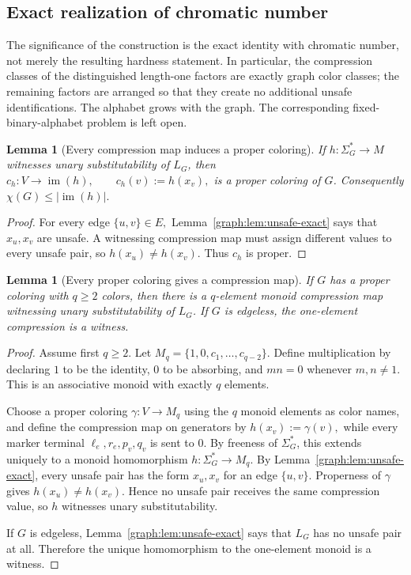 \documentclass[10pt,a4paper]{article}
\newtheorem{lemma}[theorem]{Lemma}
\theoremstyle{definition}
\theoremstyle{remark}
\begin{document}
\subsection{Exact realization of chromatic number}

The significance of the construction is the exact identity with chromatic
number, not merely the resulting hardness statement. In particular, the
compression classes of the distinguished length-one factors are exactly graph
color classes; the remaining factors are arranged so that they create no
additional unsafe identifications. The alphabet grows with the graph. The
corresponding fixed-binary-alphabet problem is left open.

\begin{lemma}[Every compression map induces a proper coloring]
\label{graph:lem:lower-coloring}
If \(h:\Sigma_G^*\to M\) witnesses unary substitutability of \(L_G\), then \(c_h:V\to\operatorname{im}(h), \qquad c_h(v):=h(x_v),\) is a proper coloring of \(G\).
Consequently
\(
\chi(G)\le|\operatorname{im}(h)|.
\)
\end{lemma}

\begin{proof}
For every edge \(\{u,v\}\in E,\) Lemma~\ref{graph:lem:unsafe-exact} says that \(x_u,x_v\) are unsafe.
A witnessing compression map must assign different values to every unsafe pair,
so \(h(x_u)\neq h(x_v).\) Thus \(c_h\) is proper.
\end{proof}

\begin{lemma}[Every proper coloring gives a compression map]
\label{graph:lem:upper-coloring}
If \(G\) has a proper coloring with \(q\ge2\) colors, then there is a
\(q\)-element monoid compression map witnessing unary substitutability of \(L_G\).
If \(G\) is edgeless, the one-element compression is a witness.
\end{lemma}

\begin{proof}
Assume first \(q\ge2\).
Let \(M_q=\{1,0,c_1,\ldots,c_{q-2}\}.\) Define multiplication by declaring \(1\) to be the identity, \(0\) to be
absorbing, and \(mn=0\) whenever \(m,n\neq1\).
This is an associative monoid with exactly \(q\) elements.

Choose a proper coloring \(\gamma:V\to M_q\) using the \(q\) monoid elements as color names, and define the compression map on
generators by \(h(x_v):=\gamma(v),\) while every marker terminal \(\ell_e,r_e,p_v,q_v\) is sent to \(0\).
By freeness of \(\Sigma_G^*\), this extends uniquely to a monoid homomorphism \(h:\Sigma_G^*\to M_q.\) By Lemma~\ref{graph:lem:unsafe-exact}, every unsafe pair has the form \(x_u,x_v\) for an edge \(\{u,v\}\).
Properness of \(\gamma\) gives \(h(x_u)\neq h(x_v).\) Hence no unsafe pair receives the same compression value, so \(h\) witnesses
unary substitutability.

If \(G\) is edgeless, Lemma~\ref{graph:lem:unsafe-exact} says that \(L_G\) has no
unsafe pair at all. Therefore the unique homomorphism to the one-element
monoid is a witness.
\end{proof}
\end{document}

